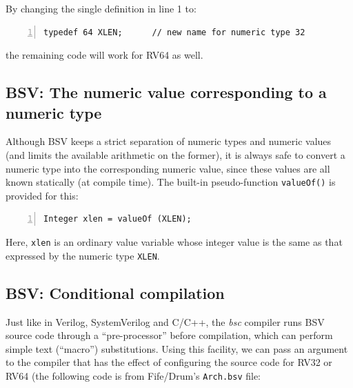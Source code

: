 By changing the single definition in line 1 to:
\begin{Verbatim}[frame=single, numbers=left]
   typedef 64 XLEN;      // new name for numeric type 32
\end{Verbatim}
the remaining code will work for RV64 as well.


\subsection{BSV: The numeric value corresponding to a numeric type}

\label{BSV_value_of_numeric_type}


Although BSV keeps a strict separation of numeric types and numeric
values (and limits the available arithmetic on the former), it is
always safe to convert a numeric type into the corresponding numeric
value, since these values are all known statically (at compile time).
The built-in pseudo-function \verb|valueOf()| is provided for this:

\begin{Verbatim}[frame=single, numbers=left]
   Integer xlen = valueOf (XLEN);
\end{Verbatim}

Here, \verb|xlen| is an ordinary value variable whose integer value is
the same as that expressed by the numeric type \verb|XLEN|.


\subsection{BSV: Conditional compilation}

\label{BSV_Conditional_compilation}


Just like in Verilog, SystemVerilog and C/C++, the \emph{bsc} compiler
runs BSV source code through a ``pre-processor'' before compilation,
which can perform simple text (``macro'') substitutions.  Using this
facility, we can pass an argument to the compiler that has the effect
of configuring the source code for RV32 or RV64 (the following code is
from Fife/Drum's \verb|Arch.bsv| file:

